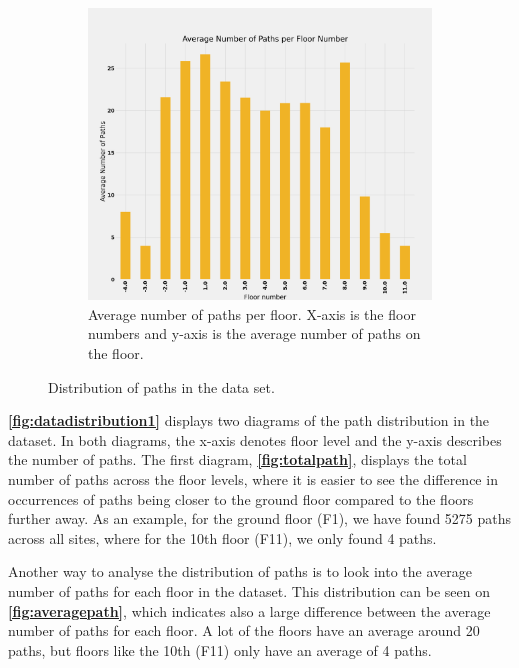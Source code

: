 \begin{figure}[H]
\begin{subfigure}[b]{0.49\textwidth}
         \includegraphics[width=\textwidth]{Images/ProblemAnalysis/datadistribution3.png}
         \caption{Average number of paths per floor. X-axis is the floor numbers and y-axis is the average number of paths on the floor.}
         \label{fig:averagepath}
     \end{subfigure}
        \caption{Distribution of paths in the data set.}
        \label{fig:datadistribution1}
\end{figure}

\textbf{\autoref{fig:datadistribution1}} displays two diagrams of the path distribution in the dataset. In both diagrams, the x-axis denotes floor level and the y-axis describes the number of paths. The first diagram, \textbf{\autoref{fig:totalpath}}, displays the total number of paths across the floor levels, where it is easier to see the difference in occurrences of paths being closer to the ground floor compared to the floors further away. As an example, for the ground floor (F1), we have found 5275 paths across all sites, where for the 10th floor (F11), we only found 4 paths.

Another way to analyse the distribution of paths is to look into the average number of paths for each floor in the dataset. This distribution can be seen on \textbf{\autoref{fig:averagepath}}, which indicates also a large difference between the average number of paths for each floor. A lot of the floors have an average around 20 paths, but floors like the 10th (F11) only have an average of 4 paths.

